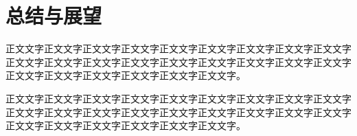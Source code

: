 \chapter{总结与展望}
正文文字正文文字正文文字正文文字正文文字正文文字正文文字正文文字正文文字正文文字正文文字正文文字正文文字正文文字正文文字正文文字正文文字正文文字正文文字正文文字正文文字正文文字正文文字正文文字。

正文文字正文文字正文文字正文文字正文文字正文文字正文文字正文文字正文文字正文文字正文文字正文文字正文文字正文文字正文文字正文文字正文文字正文文字正文文字正文文字正文文字正文文字正文文字正文文字。
